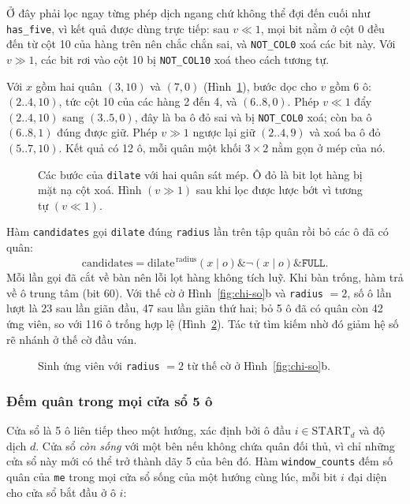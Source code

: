 Ở đây phải lọc ngay từng phép dịch ngang chứ không thể đợi đến cuối như \texttt{has\_five}, vì kết quả được dùng trực tiếp: sau $v \ll 1$, mọi bit nằm ở cột 0 đều đến từ cột 10 của hàng trên nên chắc chắn sai, và \texttt{NOT\_COL0} xoá các bit này. Với $v \gg 1$, các bit rơi vào cột 10 bị \texttt{NOT\_COL10} xoá theo cách tương tự.

\begin{vidu}
Với $x$ gồm hai quân $(3, 10)$ và $(7, 0)$ (Hình~\ref{fig:gian-no}), bước dọc cho $v$ gồm 6 ô: $(2..4, 10)$, tức cột 10 của các hàng 2 đến 4, và $(6..8, 0)$. Phép $v \ll 1$ đẩy $(2..4, 10)$ sang $(3..5, 0)$, đây là ba ô đỏ sai và bị \texttt{NOT\_COL0} xoá; còn ba ô $(6..8, 1)$ đúng được giữ. Phép $v \gg 1$ ngược lại giữ $(2..4, 9)$ và xoá ba ô đỏ $(5..7, 10)$. Kết quả có 12 ô, mỗi quân một khối $3 \times 2$ nằm gọn ở mép của nó.
\end{vidu}

\begin{figure}[H]
  \centering
  
  \caption{Các bước của \texttt{dilate} với hai quân sát mép. Ô đỏ là bit lọt hàng bị mặt nạ cột xoá. Hình $(v \gg 1)$ sau khi lọc được lược bớt vì tương tự $(v \ll 1)$.}
  \label{fig:gian-no}
\end{figure}

Hàm \texttt{candidates} gọi \texttt{dilate} đúng \texttt{radius} lần trên tập quân rồi bỏ các ô đã có quân:
\begin{equation}
  \mathrm{candidates} = \mathrm{dilate}^{\,\text{radius}}(x \mid o) \mathbin{\&} \lnot(x \mid o) \mathbin{\&} \texttt{FULL}.
\end{equation}
Mỗi lần gọi đã cắt về bàn nên lỗi lọt hàng không tích luỹ. Khi bàn trống, hàm trả về ô trung tâm (bit 60). Với thế cờ ở Hình~\ref{fig:chi-so}b và \texttt{radius} $= 2$, số ô lần lượt là 23 sau lần giãn đầu, 47 sau lần giãn thứ hai; bỏ 5 ô đã có quân còn 42 ứng viên, so với 116 ô trống hợp lệ (Hình~\ref{fig:ung-vien}). Tác tử tìm kiếm nhờ đó giảm hệ số rẽ nhánh ở thế cờ đầu ván.

\begin{figure}[H]
  \centering
  
  \caption{Sinh ứng viên với \texttt{radius} $= 2$ từ thế cờ ở Hình~\ref{fig:chi-so}b.}
  \label{fig:ung-vien}
\end{figure}

\subsubsection{Đếm quân trong mọi cửa sổ 5 ô}
\label{sec:bb-cua-so}
Cửa sổ là 5 ô liên tiếp theo một hướng, xác định bởi ô đầu $i \in \mathrm{START}_d$ và độ dịch $d$. Cửa sổ \emph{còn sống} với một bên nếu không chứa quân đối thủ, vì chỉ những cửa sổ này mới có thể trở thành dãy 5 của bên đó. Hàm \texttt{window\_counts} đếm số quân của \texttt{me} trong mọi cửa sổ sống của một hướng cùng lúc, mỗi bit $i$ đại diện cho cửa sổ bắt đầu ở ô $i$:

